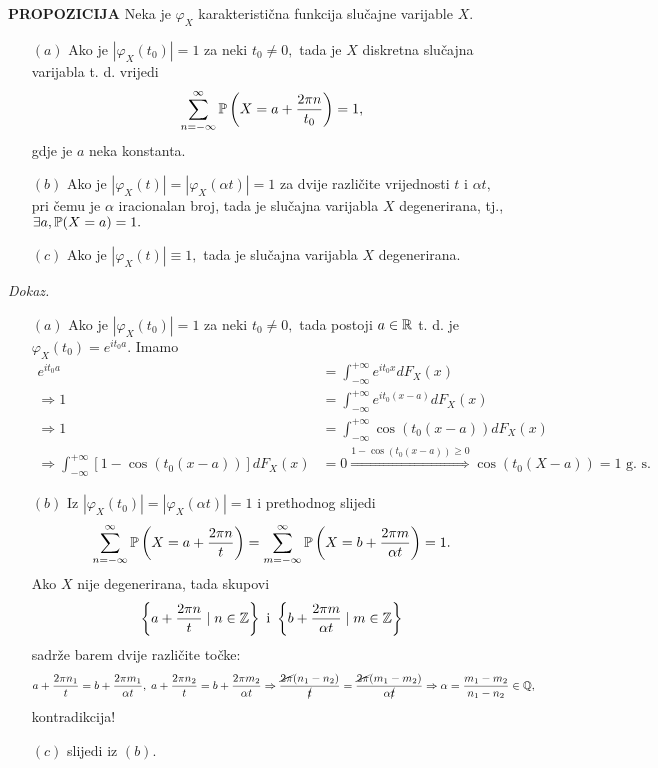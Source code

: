\documentclass{article}
\begin{document}
\textbf{PROPOZICIJA}\newline
Neka je \(\varphi_X\) karakteristična funkcija slučajne varijable \(X.\)
\begin{enumerate}
    \item[\((a)\)] Ako je \(|\varphi_X(t_0)|=1\) za neki \(t_0\ne0,\) tada je \(X\) diskretna slučajna varijabla t. d. vrijedi \[\sum_{n=-\infty}^\infty\Bbb P\left(X=a+\frac{2\pi n}{t_0}\right)=1,\] gdje je \(a\) neka konstanta.
    \item[\((b)\)] Ako je \(|\varphi_X(t)|=|\varphi_X(\alpha t)|=1\) za dvije različite vrijednosti \(t\) i \(\alpha t,\) pri čemu je \(\alpha\) iracionalan broj, tada je slučajna varijabla \(X\) degenerirana, tj., \(\exists a,\Bbb P(X=a)=1.\)
    \item[\((c)\)] Ako je \(|\varphi_X(t)|\equiv1,\) tada je slučajna varijabla \(X\) degenerirana.
\end{enumerate}
\textit{Dokaz.}
\begin{enumerate}
    \item[\((a)\)] Ako je \(|\varphi_X(t_0)|=1\) za neki \(t_0\ne0,\) tada postoji \(a\in\Bbb R\) t. d. je \(\varphi_X(t_0)=e^{it_0a}.\) Imamo \[\begin{aligned}e^{it_0a}&=\int_{-\infty}^{+\infty}e^{it_0x}dF_X(x)\\\Rightarrow1&=\int_{-\infty}^{+\infty}e^{it_0(x-a)}dF_X(x)\\\Rightarrow1&=\int_{-\infty}^{+\infty}\cos(t_0(x-a))dF_X(x)\\\Rightarrow\int_{-\infty}^{+\infty}[1-\cos(t_0(x-a))]dF_X(x)&=0\overset{1-\cos(t_0(x-a))\ge0}{\Rightarrow}\cos(t_0(X-a))=1\text{ g. s.}\end{aligned}\]
    \item[\((b)\)] Iz \(|\varphi_X(t_0)|=|\varphi_X(\alpha t)|=1\) i prethodnog slijedi \[\sum_{n=-\infty}^\infty\Bbb P\left(X=a+\frac{2\pi n}t\right)=\sum_{m=-\infty}^\infty\Bbb P\left(X=b+\frac{2\pi m}{\alpha t}\right)=1.\] Ako \(X\) nije degenerirana, tada skupovi \[\left\{a+\frac{2\pi n}t\mid n\in\Bbb Z\right\}\text{ i }\left\{b+\frac{2\pi m}{\alpha t}\mid m\in\Bbb Z\right\}\] sadrže barem dvije različite točke: \[a+\frac{2\pi n_1}t=b+\frac{2\pi m_1}{\alpha t},\;a+\frac{2\pi n_2}t=b+\frac{2\pi m_2}{\alpha t}\Rightarrow\frac{\cancel{2\pi}(n_1-n_2)}{\cancel{t}}=\frac{\cancel{2\pi}(m_1-m_2)}{\alpha\cancel{t}}\Rightarrow\alpha=\frac{m_1-m_2}{n_1-n_2}\in\Bbb Q,\] kontradikcija!
    \item[\((c)\)] slijedi iz \((b).\)
\end{enumerate}
\end{document}
